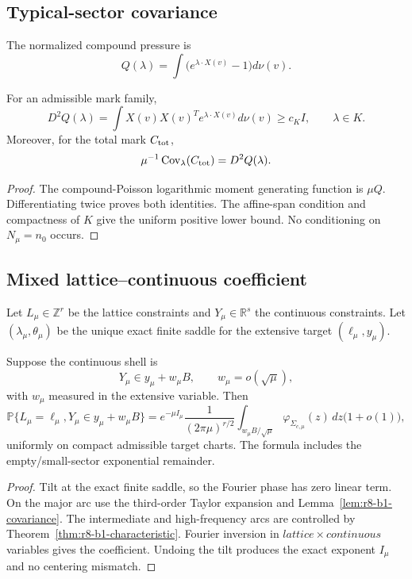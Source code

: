 \subsection{Typical-sector covariance}

The normalized compound pressure is
\[
 Q(\lambda)=\int\bigl(e^{\lambda\cdot X(v)}-1\bigr)d\nu(v).
\]

\begin{lemma}
\label{lem:r8-b1-covariance}
For an admissible mark family,
\[
 D^2Q(\lambda)=\int X(v)X(v)^T e^{\lambda\cdot X(v)}d\nu(v)
 \ge c_KI,
 \qquad\lambda\in K.
\]
Moreover, for the total mark $C_{\rm tot}$,
\[
 \mu^{-1}\operatorname{Cov}_\lambda(C_{\rm tot})=D^2Q(\lambda).
\]
\end{lemma}

\begin{proof}
The compound-Poisson logarithmic moment generating function is $\mu Q$.
Differentiating twice proves both identities.  The affine-span condition and
compactness of $K$ give the uniform positive lower bound.  No conditioning on
$N_\mu=n_0$ occurs.
\end{proof}

\subsection{Mixed lattice--continuous coefficient}

Let $L_\mu\in\mathbb Z^r$ be the lattice constraints and
$Y_\mu\in\mathbb R^s$ the continuous constraints.  Let
$(\lambda_\mu,\theta_\mu)$ be the unique exact finite saddle for the extensive
target $(\ell_\mu,y_\mu)$.

\begin{theorem}
\label{thm:r8-b1-coefficient}
Suppose the continuous shell is
\[
 Y_\mu\in y_\mu+w_\mu B,
 \qquad w_\mu=o(\sqrt\mu),
\]
with $w_\mu$ measured in the extensive variable.  Then
\[
 \mathbb P\{L_\mu=\ell_\mu,
 Y_\mu\in y_\mu+w_\mu B\}
 =e^{-\mu I_\mu}
 \frac{1}{(2\pi\mu)^{r/2}}
 \int_{w_\mu B/\sqrt\mu}
 \varphi_{\Sigma_{c,\mu}}(z)\,dz
 \bigl(1+o(1)\bigr),
\]
uniformly on compact admissible target charts.  The formula includes the
empty/small-sector exponential remainder.
\end{theorem}

\begin{proof}
Tilt at the exact finite saddle, so the Fourier phase has zero linear term.
On the major arc use the third-order Taylor expansion and
Lemma~\ref{lem:r8-b1-covariance}.  The intermediate and high-frequency arcs are
controlled by Theorem~\ref{thm:r8-b1-characteristic}.  Fourier inversion in
$lattice\times continuous$ variables gives the coefficient.  Undoing the tilt
produces the exact exponent $I_\mu$ and no centering mismatch.
\end{proof}

